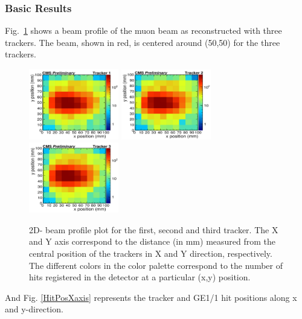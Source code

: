 \subsubsection{Basic Results} %
\label{ssub:basic_results}
Fig.~\ref{BeamProfile} shows a beam profile of the muon beam as reconstructed with three trackers. The beam, shown in red, is centered around (50,50) for the three trackers.
\begin{figure}[!htbp]
\centering
\includegraphics[width=0.35\textwidth]{figures/GEM/Selection_027.png}%
\includegraphics[width=0.35\textwidth]{figures/GEM/Selection_028.png}%
\includegraphics[width=0.35\textwidth]{figures/GEM/Selection_029.png}
\caption{2D- beam profile plot for the first, second and third tracker. The X and Y axis correspond to the distance (in mm) measured from the central position of the trackers in X and Y direction, respectively. The different colors in the color palette correspond to the number of hits registered in the detector at a particular (x,y) position.}\label{BeamProfile}
\end{figure}
And Fig. \ref{HitPosXaxis} represents the tracker and GE1/1 hit positions along x and y-direction.
